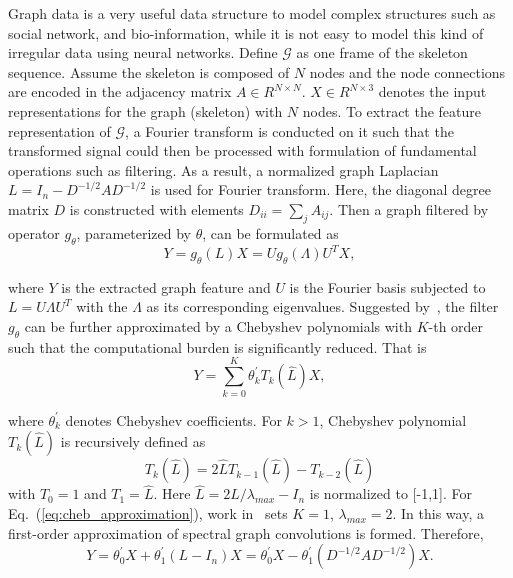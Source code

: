 \documentclass[letterpaper]{article} \usepackage{aaai19}  \usepackage{times}  \usepackage{helvet} \usepackage{courier}  \usepackage[hyphens]{url}  \usepackage{graphicx} \urlstyle{rm} \def\UrlFont{\rm}  \usepackage{graphicx}  \frenchspacing  \setlength{\pdfpagewidth}{8.5in}  \setlength{\pdfpageheight}{11in}
\begin{document}
Graph data is a very useful data structure to model complex structures such as social network, and bio-information, while it is not easy to model this kind of irregular data using neural networks. Define $\mathcal{G}$ as one frame of the skeleton sequence. Assume the skeleton is composed of $N$ nodes and the node connections are encoded in the adjacency matrix $A \in \mathit{R}^{N \times N}$. $X \in \mathit{R}^{N\times 3}$ denotes the input representations for the graph (skeleton) with $N$ nodes. To extract the feature representation of $\mathcal{G}$, a Fourier transform is conducted on it such that the transformed signal could then be processed with formulation of fundamental operations such as filtering. As a result, a normalized graph Laplacian $L = I_n - D^{-1/2}AD^{-1/2}$ is used for Fourier transform. Here, the diagonal degree matrix $D$ is constructed with elements $D_{ii} = \sum_{j}A_{ij}$. Then a graph filtered by operator $g_{\theta}$, parameterized by $\theta$, can be formulated as
\begin{equation}
    Y = g_{\theta}(L)X = U g_{\theta}(\Lambda) U^{T}X,
\end{equation}


\noindent where $Y$ is the extracted graph feature and $U$ is the Fourier basis subjected to $L = U \Lambda U^T$ with the $\Lambda$ as its corresponding eigenvalues. Suggested by~\cite{hammond2011wavelets}, the filter $g_{\theta}$ can be further approximated by a Chebyshev polynomials with $K$-th order such that the computational burden is significantly reduced. That is
\begin{equation}\label{eq:cheb_approximation}
    Y = \sum_{k=0}^{K}\theta_k^{'}T_k(\hat{L})X,
\end{equation}

\noindent where $\theta_k^{'}$ denotes Chebyshev coefficients. For $k>1$, Chebyshev polynomial $T_k(\hat{L})$ is recursively defined as
\begin{equation}\label{eq:cheb}
    T_k(\hat{L}) = 2\hat{L}T_{k-1}(\hat{L})-T_{k-2}(\hat{L})
\end{equation}
with $T_0 = 1$ and $T_1 = \hat{L}$. Here $\hat{L} = 2L/{\lambda_{max}}-I_n$ is normalized to [-1,1]. For Eq.~(\ref{eq:cheb_approximation}), work in~\cite{kipf2016semi} sets $K=1$, $ \lambda_{max}= 2$. In this way, a first-order approximation of spectral graph convolutions is formed. Therefore, 
\begin{equation}
    Y = \theta_0^{'}X +\theta_1^{'}(L-I_n)X = \theta_0^{'}X -\theta_1^{'}(D^{-1/2}AD^{-1/2})X.
\end{equation}
\end{document}
